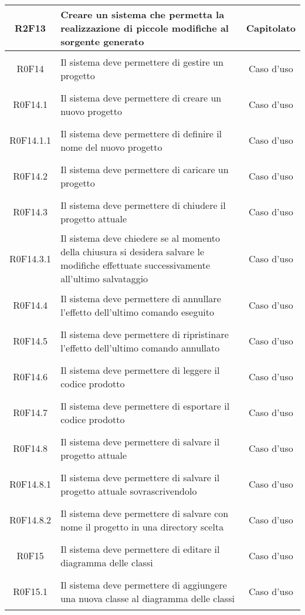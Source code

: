 \documentclass[../AnalisiDeiRequisiti.tex]{subfiles}
\begin{document}
\begin{longtable}{|c|>{\centering}p{7cm}|c|}
	\hypertarget{R2F13}{R2F13} & Creare un sistema che permetta la realizzazione di piccole modifiche al sorgente generato & Capitolato \\ \hline
	\hypertarget{R0F14}{R0F14} & Il sistema deve permettere di gestire un progetto & Caso d'uso \\ \hline
	\hypertarget{R0F14.1}{R0F14.1} & Il sistema deve permettere di creare un nuovo progetto & Caso d'uso \\ \hline
	\hypertarget{R0F14.1.1}{R0F14.1.1} & Il sistema deve permettere di definire il nome del nuovo progetto & Caso d'uso \\ \hline
	\hypertarget{R0F14.2}{R0F14.2} & Il sistema deve permettere di caricare un progetto
	& Caso d'uso \\ \hline
	\hypertarget{R0F14.3}{R0F14.3} & Il sistema deve permettere di chiudere il progetto attuale & Caso d'uso \\ \hline
	\hypertarget{R0F14.3.1}{R0F14.3.1} & Il sistema deve chiedere se al momento della chiusura si desidera  salvare le modifiche effettuate successivamente all'ultimo salvataggio & Caso d'uso \\ \hline
	\hypertarget{R0F14.4}{R0F14.4} & Il sistema deve permettere di annullare l'effetto dell'ultimo comando eseguito & Caso d'uso \\ \hline
	\hypertarget{R0F14.5}{R0F14.5} & Il sistema deve permettere di ripristinare l'effetto dell'ultimo comando annullato & Caso d'uso \\ \hline
	\hypertarget{R0F14.6}{R0F14.6} & Il sistema deve permettere di leggere il codice prodotto & Caso d'uso \\ \hline
	\hypertarget{R0F14.7}{R0F14.7} & Il sistema deve permettere di esportare il codice prodotto & Caso d'uso \\ \hline
	\hypertarget{R0F14.8}{R0F14.8} & Il sistema deve permettere di salvare il progetto attuale & Caso d'uso \\ \hline
	\hypertarget{R0F14.8.1}{R0F14.8.1} & Il sistema deve permettere di salvare il progetto attuale sovrascrivendolo & Caso d'uso \\ \hline
	\hypertarget{R0F14.8.2}{R0F14.8.2} & Il sistema deve permettere di salvare con nome il progetto in una directory scelta & Caso d'uso \\ \hline
	\hypertarget{R0F15}{R0F15} & Il sistema deve permettere di editare il diagramma delle classi & Caso d'uso \\ \hline
	\hypertarget{R0F15.1}{R0F15.1} & Il sistema deve permettere di aggiungere una nuova classe al diagramma delle classi & Caso d'uso \\ \hline

\end{longtable}
\end{document}
